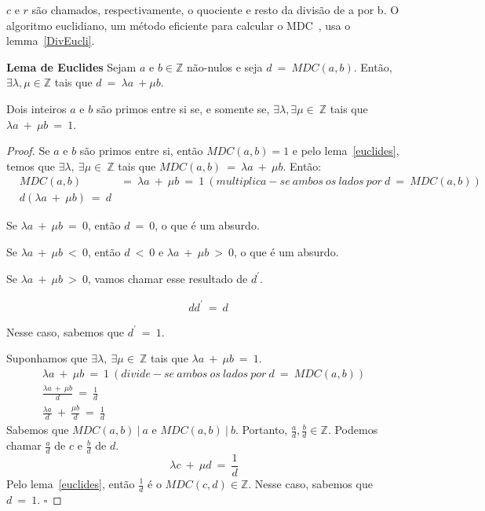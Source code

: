 $c$ e $r$ são chamados, respectivamente, o quociente e resto da divisão de a por b. O algoritmo euclidiano, um método eficiente para calcular o MDC~\cite{Rosen:2003}, usa o lemma~\ref{DivEucli}. 

\begin{theorem} {\bf Lema de Euclides} \label{euclides}  Sejam $a$ e $b \in \mathbb{Z}$ não-nulos e seja $d\ =\ MDC(a,b)$. Então, $\exists \lambda, \mu \in \mathbb{Z}$ tais que $d\ = \ \lambda a\ + \mu b$.
 \end{theorem}

\begin{proposition} \label{primos} Dois inteiros $a$  e $b$ são primos entre si se, e somente se, $\exists \lambda, \exists \mu \in\ \mathbb{Z}$ tais que $\lambda a\ +\ \mu b\ =\ 1$.
\end{proposition}

\begin{proof}
Se $a$ e $b$ são primos entre si, então $MDC(a,b)=1$ e pelo lema~\ref{euclides}, temos que  $\exists \lambda, \ \exists \mu \in\ \mathbb{Z}$ tais que $MDC(a,b)\ =\ \lambda a\ +\ \mu b$.  Então: 
\begin{align*}
& MDC(a,b)\ & =\ \lambda a\ +\ \mu b\ =\ 1\ (multiplica-se\ ambos\ os\ lados\ por\ d\ =\ MDC(a,b))\\
& d(\lambda a\ +\ \mu b)\ =\ d
\end{align*}

Se $\lambda a\ +\ \mu b\ =\ 0$, então $d\ =\ 0$, o que é um absurdo.

Se $\lambda a\ +\ \mu b\ <\ 0$, então  $d\ <\ 0$ e $\lambda a\ +\ \mu b\ >\ 0$, o que é um absurdo.

Se $\lambda a\ +\ \mu b\ >\ 0$, vamos chamar esse resultado de $d^{'}$.

\begin{align*}
& dd^{'}\ =\ d
\end{align*}

Nesse caso, sabemos que $d^{'}\ =\ 1$.

Suponhamos que $\exists \lambda, \ \exists \mu \in\ \mathbb{Z}$ tais que $\lambda a\ +\ \mu b\ =\ 1$. 
$$
\begin{array}{cl}
\lambda a\ +\ \mu b\ =\ 1\ (divide-se\ ambos\ os\ lados\ por\ d\ =\ MDC(a,b))\\
\frac{\lambda a\ +\ \mu b}{d}\ =\ \frac{1}{d}\\
\frac{\lambda a}{d}\ +\ \frac{\mu b}{d}\ =\ \frac{1}{d}
\end{array}
$$
Sabemos que $MDC(a,b)\ |\ a$ e $MDC(a,b)\ |\ b$. Portanto, $\frac{a}{d}, \frac{b}{d} \in \mathbb{Z}$. Podemos chamar  $\frac{a}{d}$ de $c$ e $\frac{b}{d}$ de $d$.
$$
\lambda c\ +\ \mu d\ =\ \frac{1}{d}
$$
Pelo lema~\ref{euclides}, então  $\frac{1}{d}$ é o $MDC(c, d) \in \mathbb{Z}$. Nesse caso, sabemos que $d\ =\ 1$. 
$\square$
\end{proof}


